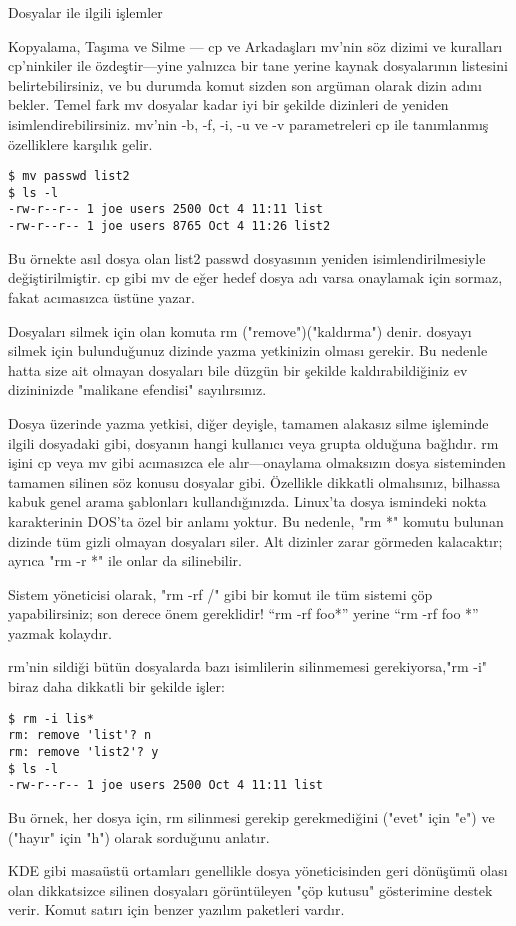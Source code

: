 \begin{section}{Dosyalar ile ilgili işlemler}
\begin{subsection}{Kopyalama, Taşıma ve Silme — cp ve Arkadaşları}
mv'nin söz dizimi ve kuralları cp'ninkiler ile özdeştir—yine yalnızca bir tane yerine kaynak dosyalarının listesini belirtebilirsiniz, ve bu durumda komut sizden son argüman olarak dizin adını bekler. Temel fark mv dosyalar kadar iyi bir şekilde dizinleri de yeniden isimlendirebilirsiniz.
mv'nin -b, -f, -i, -u ve -v parametreleri cp ile tanımlanmış özelliklere karşılık gelir.
\begin{verbatim}
$ mv passwd list2
$ ls -l
-rw-r--r-- 1 joe users 2500 Oct 4 11:11 list
-rw-r--r-- 1 joe users 8765 Oct 4 11:26 list2
\end{verbatim}
Bu örnekte asıl dosya olan list2 passwd dosyasının yeniden isimlendirilmesiyle değiştirilmiştir. cp gibi mv de eğer hedef dosya adı varsa onaylamak için sormaz, fakat acımasızca üstüne yazar.

Dosyaları silmek için olan komuta rm ("remove")("kaldırma") denir. dosyayı silmek için bulunduğunuz dizinde yazma yetkinizin olması gerekir. Bu nedenle hatta size ait olmayan dosyaları bile düzgün bir şekilde kaldırabildiğiniz ev dizininizde "malikane efendisi" sayılırsınız.

Dosya üzerinde yazma yetkisi, diğer deyişle, tamamen alakasız silme işleminde ilgili dosyadaki gibi, dosyanın hangi kullanıcı veya grupta olduğuna bağlıdır.
rm işini cp veya mv gibi acımasızca ele alır—onaylama olmaksızın dosya sisteminden tamamen silinen söz konusu dosyalar gibi. Özellikle dikkatli olmalısınız,  bilhassa kabuk genel arama şablonları kullandığınızda. Linux'ta dosya ismindeki nokta karakterinin DOS'ta özel bir anlamı yoktur. Bu nedenle, "rm *" komutu bulunan dizinde tüm gizli olmayan dosyaları siler. Alt dizinler zarar görmeden kalacaktır; ayrıca "rm -r *" ile onlar da silinebilir.

Sistem yöneticisi olarak, "rm -rf /" gibi bir komut ile tüm sistemi çöp yapabilirsiniz; son derece önem gereklidir!  “rm -rf foo*” yerine “rm -rf foo *” yazmak kolaydır.

rm'nin sildiği bütün dosyalarda bazı isimlilerin silinmemesi gerekiyorsa,"rm -i" biraz daha dikkatli bir şekilde işler:
\begin{verbatim}
$ rm -i lis*
rm: remove 'list'? n
rm: remove 'list2'? y
$ ls -l
-rw-r--r-- 1 joe users 2500 Oct 4 11:11 list
\end{verbatim}
Bu örnek, her dosya için, rm silinmesi gerekip gerekmediğini ("evet" için "e") ve ("hayır" için "h") olarak sorduğunu anlatır.

KDE gibi masaüstü ortamları genellikle dosya yöneticisinden geri dönüşümü olası olan dikkatsizce silinen dosyaları görüntüleyen "çöp kutusu" gösterimine destek verir. Komut satırı için benzer yazılım paketleri vardır.


\end{subsection}
\end{section}
